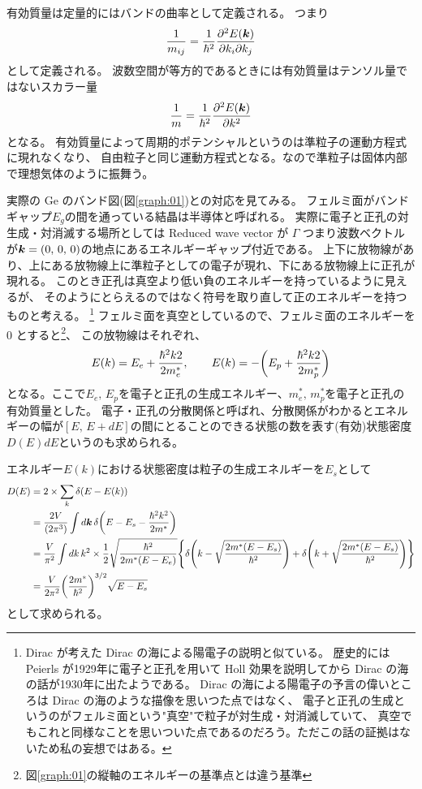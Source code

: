 \documentclass[11pt,dvipdfmx,a4paper]{jsarticle}
\numberwithin{equation}{section}
\begin{document}
有効質量は定量的にはバンドの曲率として定義される。
つまり
\begin{equation}
	\frac{1}{m_{ij}} = \frac{1}{\hbar^2}\pdv[2]{E(\vb*{k})}{k_i}{k_j}
\end{equation}
として定義される。
波数空間が等方的であるときには有効質量はテンソル量ではないスカラー量
\begin{equation}
	\frac{1}{m} = \frac{1}{\hbar^2}\pdv[2]{E(\vb*{k})}{k}
\end{equation}
となる。
有効質量によって周期的ポテンシャルというのは準粒子の運動方程式に現れなくなり、
自由粒子と同じ運動方程式となる。なので準粒子は固体内部で理想気体のように振舞う。

実際の Ge のバンド図(図\ref{graph:01})との対応を見てみる。
フェルミ面がバンドギャップ\(E_g\)の間を通っている結晶は半導体と呼ばれる。
実際に電子と正孔の対生成・対消滅する場所としては Reduced wave vector が \(\Gamma\)
つまり波数ベクトルが\(\vb*{k}=(0,\,0,\,0)\)の地点にあるエネルギーギャップ付近である。
上下に放物線があり、上にある放物線上に準粒子としての電子が現れ、下にある放物線上に正孔が現れる。
このとき正孔は真空より低い負のエネルギーを持っているように見えるが、
そのようにとらえるのではなく符号を取り直して正のエネルギーを持つものと考える。
\footnote{Dirac が考えた Dirac の海による陽電子の説明と似ている。
歴史的には Peierls が1929年に電子と正孔を用いて Holl 効果を説明してから Dirac の海の話が1930年に出たようである。
Dirac の海による陽電子の予言の偉いところは Dirac の海のような描像を思いつた点ではなく、
電子と正孔の生成というのがフェルミ面という"真空"で粒子が対生成・対消滅していて、
真空でもこれと同様なことを思いついた点であるのだろう。ただこの話の証拠はないため私の妄想ではある。}
フェルミ面を真空としているので、フェルミ面のエネルギーを 0 とすると\footnote{図\ref{graph:01}の縦軸のエネルギーの基準点とは違う基準}、
この放物線はそれぞれ、
\begin{equation}
	E(k) = E_e + \frac{\hbar^2k2}{2m_e^*}, \qquad
	E(k) = -\qty(E_p + \frac{\hbar^2k2}{2m_p^*})
\end{equation}
となる。ここで\(E_e,\,E_p\)を電子と正孔の生成エネルギー、\(m_e^*,\,m_p^*\)を電子と正孔の有効質量とした。
電子・正孔の分散関係と呼ばれ、分散関係がわかるとエネルギーの幅が\([E,\,E+dE]\)の間にとることのできる状態の数を表す(有効)状態密度\(D(E)dE\)というのも求められる。

エネルギー\(E(k)\)における状態密度は粒子の生成エネルギーを\(E_s\)として
\begin{align}
	D(E)
	&= 2\times\sum_k \delta(E-E(k)) \notag\\
	&= \frac{2V}{(2\pi^3)}\int d\vb*{k}\, \delta\qty(E-E_s - \frac{\hbar^2k^2}{2m^*}) \notag\\
	&= \frac{V}{\pi^2} \int dk\, k^2\times \frac{1}{2}\sqrt{\frac{\hbar^2}{2m^*(E-E_e)}}\qty{\delta\qty(k-\sqrt{\frac{2m^*(E-E_s)}{\hbar^2}})+\delta\qty(k+\sqrt{\frac{2m^*(E-E_s)}{\hbar^2}})} \notag\\
	&= \frac{V}{2\pi^2}\qty(\frac{2m^*}{\hbar^2})^{3/2}\sqrt{E-E_s}
\end{align}
として求められる。
\end{document}
